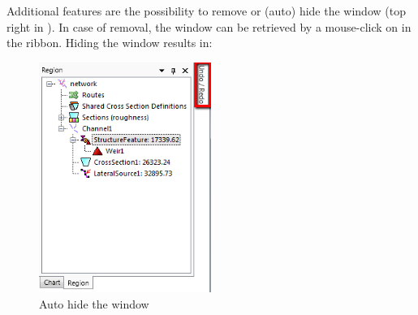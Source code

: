 %
Additional features are the possibility to remove or (auto) hide the window (top right in ). In case of removal, the window can be retrieved by a mouse-click on  in the  ribbon. Hiding the  window results in:
%
\begin{figure} [H]
	\centering
		\includegraphics[width=0.5\textwidth]{Figures/Chapter_overview/example_autohide.png}
	\caption{Auto hide the  window}
\end{figure}
